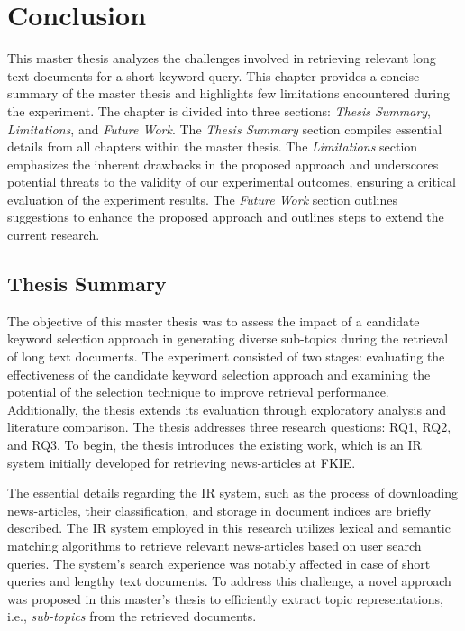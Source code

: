 
\chapter{Conclusion}

This master thesis analyzes the challenges involved in retrieving relevant long text documents for a short keyword query. This chapter provides a concise summary of the master thesis and highlights few limitations encountered during the experiment. The chapter is divided into three sections: \emph{Thesis Summary}, \emph{Limitations}, and \emph{Future Work}. The \emph{Thesis Summary} section compiles essential details from all chapters within the master thesis. The \emph{Limitations} section emphasizes the inherent drawbacks in the proposed approach and underscores potential threats to the validity of our experimental outcomes, ensuring a critical evaluation of the experiment results. The \emph{Future Work} section outlines suggestions to enhance the proposed approach and outlines steps to extend the current research.

\section{Thesis Summary}

The objective of this master thesis was to assess the impact of a candidate keyword selection approach in generating diverse sub-topics during the retrieval of long text documents. The experiment consisted of two stages: evaluating the effectiveness of the candidate keyword selection approach and examining the potential of the selection technique to improve retrieval performance. Additionally, the thesis extends its evaluation through exploratory analysis and literature comparison. The thesis addresses three research questions: RQ1, RQ2, and RQ3. To begin, the thesis introduces the existing work, which is an \ac{IR} system initially developed for retrieving news-articles at \ac{FKIE}. 

The essential details regarding the \ac{IR} system, such as the process of downloading news-articles, their classification, and storage in document indices are briefly described. The \ac{IR} system employed in this research utilizes lexical and semantic matching algorithms to retrieve relevant news-articles based on user search queries. The system's search experience was notably affected in case of short queries and lengthy text documents. To address this challenge, a novel approach was proposed in this master's thesis to efficiently extract topic representations, i.e., \emph{sub-topics} from the retrieved documents.

